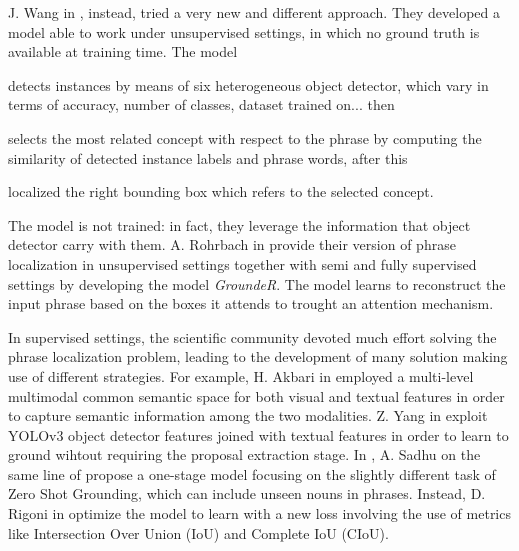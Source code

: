 J. Wang in \etal{} , instead, tried a very new
and different approach. They developed a model able to work under
unsupervised settings, in which no ground truth is available at
training time. The model 
\begin{enumerate*}[label=(\roman*)] 
    \item detects instances by means of six heterogeneous object
    detector, which vary in terms of accuracy, number of classes,
    dataset trained on... then
    \item selects the most related concept with respect to the phrase
    by computing the similarity of detected instance labels and phrase
    words, after this
    \item localized the right bounding box which refers to the
    selected concept.
\end{enumerate*}
The model is not trained: in fact, they leverage the information that
object detector carry with them. A. Rohrbach \etal{} in  provide their version of phrase localization in
unsupervised settings together with semi and fully supervised settings
by developing the model \textit{GroundeR}. The model learns to
reconstruct the input phrase based on the boxes it attends to trought
an attention mechanism. 

In supervised settings, the scientific community devoted much effort
solving the phrase localization problem, leading to the development of
many solution making use of different strategies. For example, H.
Akbari \etal{} in  employed a
multi-level multimodal common semantic space for both visual and
textual features in order to capture semantic information among the
two modalities. Z. Yang \etal{} in  exploit YOLOv3 object detector features joined with textual
features in order to learn to ground wihtout requiring the proposal
extraction stage. In , A. Sadhu \etal{}
on the same line of  propose
a one-stage model focusing on the slightly different task of Zero Shot
Grounding, which can include unseen nouns in phrases. Instead, D.
Rigoni \etal{} in  optimize the model to
learn with a new loss involving the use of metrics like Intersection
Over Union (IoU) and Complete IoU (CIoU).

